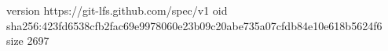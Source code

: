 version https://git-lfs.github.com/spec/v1
oid sha256:423fd6538cfb2fac69e9978060e23b09c20abe735a07cfdb84e10e618b5624f6
size 2697
